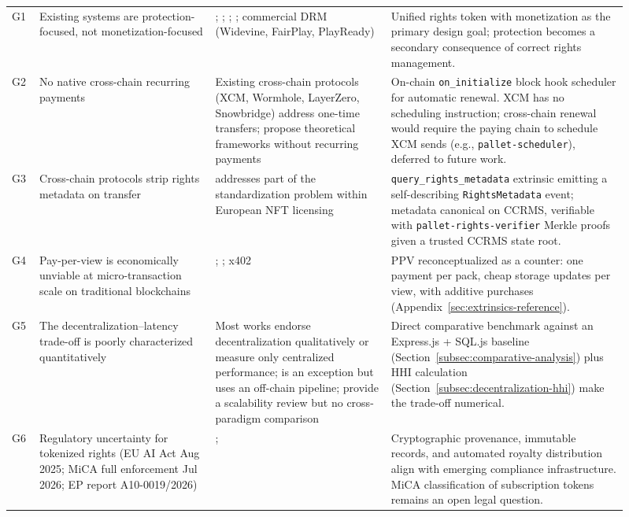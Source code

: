 \begin{longtable}{@{}L{0.04\linewidth} L{0.26\linewidth} L{0.26\linewidth} L{0.35\linewidth}@{}}
G1 & Existing systems are protection-focused, not monetization-focused & \citet{garbaEtAl2021}; \citet{patilEtAl2022}; \citet{cirelloEtAl2023}; \citet{madapatiPradhan2025}; commercial DRM (Widevine, FairPlay, PlayReady) & Unified rights token with monetization as the primary design goal; protection becomes a secondary consequence of correct rights management. \\
\addlinespace
G2 & No native cross-chain recurring payments & Existing cross-chain protocols (XCM, Wormhole, LayerZero, Snowbridge) address one-time transfers; \citet{xieLiu2022, xieTang2024a} propose theoretical frameworks without recurring payments & On-chain \texttt{on\_initialize} block hook scheduler for automatic renewal. XCM has no scheduling instruction; cross-chain renewal would require the paying chain to schedule XCM sends (e.g., \texttt{pallet-scheduler}), deferred to future work. \\
\addlinespace
G3 & Cross-chain protocols strip rights metadata on transfer & \citet{reggianini2025} addresses part of the standardization problem within European NFT licensing & \texttt{query\_rights\_metadata} extrinsic emitting a self-describing \texttt{RightsMetadata} event; metadata canonical on CCRMS, verifiable with \texttt{pallet-rights-verifier} Merkle proofs given a trusted CCRMS state root. \\
\addlinespace
G4 & Pay-per-view is economically unviable at micro-transaction scale on traditional blockchains & \citet{goyalEtAl2019}; \citet{chegenizadehEtAl2024}; x402 \citep{coinbaseX402_2025} & PPV reconceptualized as a counter: one payment per pack, cheap storage updates per view, with additive purchases (Appendix~\ref{sec:extrinsics-reference}). \\
\addlinespace
G5 & The decentralization--latency trade-off is poorly characterized quantitatively & Most works endorse decentralization qualitatively or measure only centralized performance; \citet{madapatiPradhan2025} is an exception but uses an off-chain pipeline; \citet{raoEtAl2024} provide a scalability review but no cross-paradigm comparison & Direct comparative benchmark against an Express.js + SQL.js baseline (Section~\ref{subsec:comparative-analysis}) plus HHI calculation (Section~\ref{subsec:decentralization-hhi}) make the trade-off numerical. \\
\addlinespace
G6 & Regulatory uncertainty for tokenized rights (EU AI Act Aug 2025; MiCA full enforcement Jul 2026; EP report A10-0019/2026) & \citet{esma2025}; \citet{guadamuz2025} & Cryptographic provenance, immutable records, and automated royalty distribution align with emerging compliance infrastructure. MiCA classification of subscription tokens remains an open legal question. \\

\end{longtable}
